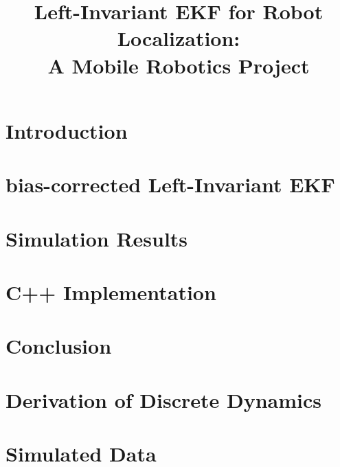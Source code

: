 \documentclass{IEEEtran}
\title{Left-Invariant EKF for Robot Localization:\\%
A Mobile Robotics Project}
\author{}
\begin{document}
\maketitle



\section{Introduction}


%

\section{bias-corrected Left-Invariant EKF}


\section{Simulation Results} \label{sec:simulation_results}


\section{C++ Implementation}


\section{Conclusion}


%


%

\begin{appendices}\label{appendices}

\section{Derivation of Discrete Dynamics} \label{sec:dyn_sec}


\section{Simulated Data} \label{sec:fake_data}


\end{appendices}
\end{document}
